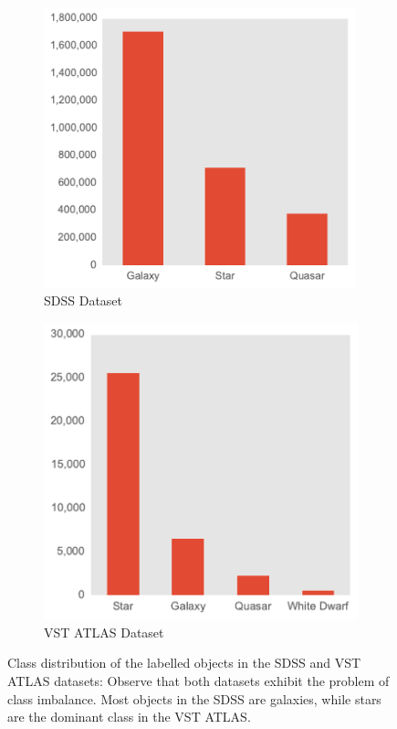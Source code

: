 \begin{figure}[tbp]
	\centering
	\begin{subfigure}{.5\textwidth}
		\centering
		\includegraphics[width=0.99\textwidth]{figures/bar_training_class_distribution}
		\caption{SDSS Dataset}
		\label{fig:class_dist_sdss}
	\end{subfigure}%
	\begin{subfigure}{.5\textwidth}
		\centering
		\includegraphics[width=0.99\linewidth]{figures/bar_vstatlas_class_distribution}
		\caption{VST ATLAS Dataset}
		\label{fig:class_dist_vst}
	\end{subfigure}
	\caption[Distribution of the classes in the SDSS and VST ATLAS datasets]{
		Class distribution of the labelled objects in the SDSS and VST ATLAS datasets: Observe
		that both datasets exhibit the problem of class imbalance. Most objects in the
		SDSS are galaxies, while stars are the dominant class in the VST ATLAS.}
	\label{fig:class_dist}
\end{figure}



